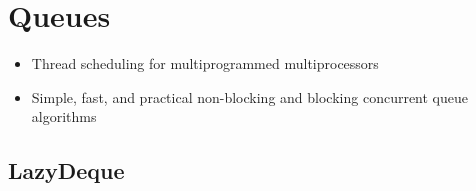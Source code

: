 
\chapter{Queues}
\label{chap:queues-implementation}

\begin{itemize}
\item Thread scheduling for multiprogrammed multiprocessors
  \cite{Arora2001}
\item Simple, fast, and practical non-blocking and blocking concurrent
  queue algorithms \cite{Michael1996}
\end{itemize}

\section{LazyDeque}
\label{sec:queues-implementation-lazy-deque}


    
      
    
    
    
